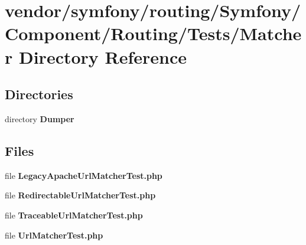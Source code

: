 \section{vendor/symfony/routing/\+Symfony/\+Component/\+Routing/\+Tests/\+Matcher Directory Reference}
\label{dir_b41dda0ca8aed07b179c4abaf70f3e21}
\subsection*{Directories}
\begin{DoxyCompactItemize}
\item 
directory {\bf Dumper}
\end{DoxyCompactItemize}
\subsection*{Files}
\begin{DoxyCompactItemize}
\item 
file {\bf Legacy\+Apache\+Url\+Matcher\+Test.\+php}
\item 
file {\bf Redirectable\+Url\+Matcher\+Test.\+php}
\item 
file {\bf Traceable\+Url\+Matcher\+Test.\+php}
\item 
file {\bf Url\+Matcher\+Test.\+php}
\end{DoxyCompactItemize}
